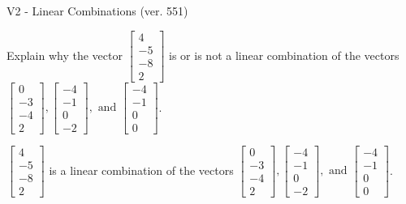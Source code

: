 \begin{exercise}
  \begin{exerciseTitle}V2 - Linear Combinations (ver. 551)\end{exerciseTitle}
  \begin{exerciseStatement}
    Explain why the vector \(\left[\begin{array}{c}
4 \\
-5 \\
-8 \\
2
\end{array}\right]\)  is or is not a linear 
	combination of the vectors \(\left[\begin{array}{c}
0 \\
-3 \\
-4 \\
2
\end{array}\right] , \left[\begin{array}{c}
-4 \\
-1 \\
0 \\
-2
\end{array}\right] , \text{ and } \left[\begin{array}{c}
-4 \\
-1 \\
0 \\
0
\end{array}\right]\).
	


  \end{exerciseStatement}
  \begin{exerciseAnswer}
   \(\left[\begin{array}{c}
4 \\
-5 \\
-8 \\
2
\end{array}\right]\) 
  	 is  
	a linear combination of the vectors \(\left[\begin{array}{c}
0 \\
-3 \\
-4 \\
2
\end{array}\right] , \left[\begin{array}{c}
-4 \\
-1 \\
0 \\
-2
\end{array}\right] , \text{ and } \left[\begin{array}{c}
-4 \\
-1 \\
0 \\
0
\end{array}\right]\).

	
  


  \end{exerciseAnswer}
\end{exercise}